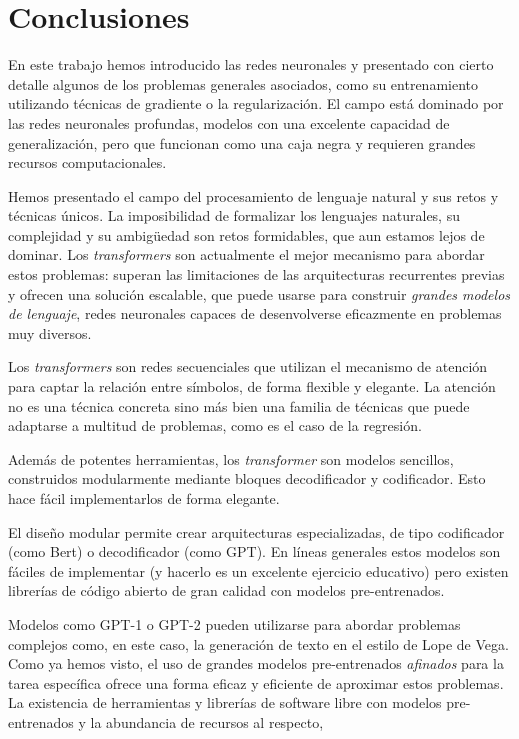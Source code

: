 \chapter{Conclusiones}
En este trabajo hemos introducido las redes neuronales y presentado con cierto detalle algunos de los problemas generales asociados, como su entrenamiento utilizando técnicas de gradiente o la regularización. El campo está dominado por las redes neuronales profundas, modelos con una excelente capacidad de generalización, pero que funcionan como una caja negra y requieren grandes recursos computacionales.

Hemos presentado el campo del procesamiento de lenguaje natural y sus retos y técnicas únicos. La imposibilidad de formalizar los lenguajes naturales, su complejidad y su ambigüedad son retos formidables, que aun estamos lejos de dominar. Los \textit{transformers} son actualmente el mejor mecanismo para abordar estos problemas: superan las limitaciones de las arquitecturas recurrentes previas y ofrecen una solución escalable, que puede usarse para construir \textit{grandes modelos de lenguaje}, redes neuronales capaces de desenvolverse eficazmente en problemas muy diversos.

Los \textit{transformers} son redes secuenciales que utilizan el mecanismo de atención para captar la relación entre símbolos, de forma flexible y elegante. La atención no es una técnica concreta sino más bien una familia de técnicas que puede adaptarse a multitud de problemas, como es el caso de la regresión.

Además de potentes herramientas, los \textit{transformer} son modelos sencillos, construidos modularmente mediante bloques decodificador y codificador. Esto hace fácil implementarlos de forma elegante. 

El diseño modular permite crear arquitecturas especializadas, de tipo codificador (como Bert) o decodificador (como GPT). En líneas generales estos modelos son fáciles de implementar (y hacerlo es un excelente ejercicio educativo) pero existen librerías de código abierto de gran calidad con modelos pre-entrenados.

Modelos como GPT-1 o GPT-2 pueden utilizarse para abordar problemas complejos como, en este caso, la generación de texto en el estilo de Lope de Vega. Como ya hemos visto, el uso de grandes modelos pre-entrenados \textit{afinados} para la tarea específica ofrece una forma eficaz y eficiente de aproximar estos problemas. La existencia de herramientas y librerías de software libre con modelos pre-entrenados y la abundancia de recursos al respecto, 

